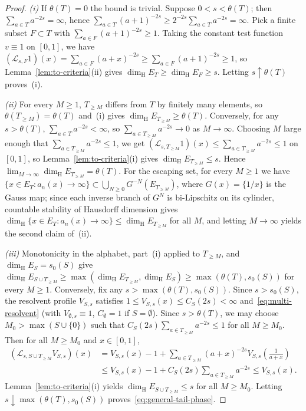 \documentclass[11pt]{article}
\theoremstyle{definition}
\theoremstyle{remark}
\newcommand{\dimH}{\dim_{\mathrm{H}}}
\begin{document}
\begin{proof}
\emph{(i)} If $\theta(T)=0$ the bound is trivial. Suppose $0<s<\theta(T)$;
then $\sum_{a\in T}a^{-2s}=\infty$, hence $\sum_{a\in T}(a+1)^{-2s}\ge
2^{-2s}\sum_{a\in T}a^{-2s}=\infty$. Pick a finite subset $F\subset T$ with
$\sum_{a\in F}(a+1)^{-2s}\ge1$. Taking the constant test function $v\equiv1$
on $[0,1]$, we have $(\mathcal L_{s,F}1)(x)=\sum_{a\in F}(a+x)^{-2s}
\ge\sum_{a\in F}(a+1)^{-2s}\ge1$, so Lemma~\ref{lem:to-criteria}(ii) gives
$\dimH E_T\ge\dimH E_F\ge s$. Letting $s\uparrow\theta(T)$ proves~(i).

\emph{(ii)} For every $M\ge1$, $T_{\ge M}$ differs from $T$ by finitely many
elements, so $\theta(T_{\ge M})=\theta(T)$ and~(i) gives
$\dimH E_{T_{\ge M}}\ge\theta(T)$. Conversely, for any $s>\theta(T)$,
$\sum_{a\in T}a^{-2s}<\infty$, so $\sum_{a\in T_{\ge M}}a^{-2s}\to0$ as
$M\to\infty$. Choosing $M$ large enough that $\sum_{a\in T_{\ge M}}a^{-2s}\le1$,
we get $(\mathcal L_{s,T_{\ge M}}1)(x)\le\sum_{a\in T_{\ge M}}a^{-2s}\le1$
on $[0,1]$, so Lemma~\ref{lem:to-criteria}(i) gives $\dimH E_{T_{\ge M}}\le s$.
Hence $\lim_{M\to\infty}\dimH E_{T_{\ge M}}=\theta(T)$. For the escaping set,
for every $M\ge1$ we have
$\{x\in E_T:a_n(x)\to\infty\}\subset\bigcup_{N\ge0}G^{-N}(E_{T_{\ge M}})$,
where $G(x)=\{1/x\}$ is the Gauss map; since each inverse branch of $G^N$ is
bi-Lipschitz on its cylinder, countable stability of Hausdorff dimension
gives $\dimH\{x\in E_T:a_n(x)\to\infty\}\le\dimH E_{T_{\ge M}}$ for all $M$,
and letting $M\to\infty$ yields the second claim of~(ii).

\emph{(iii)} Monotonicity in the alphabet, part~(i) applied to $T_{\ge M}$,
and $\dimH E_S=s_0(S)$ give
$\dimH E_{S\cup T_{\ge M}}\ge\max(\dimH E_{T_{\ge M}},\dimH E_S)\ge\max(\theta(T),s_0(S))$
for every $M\ge1$. Conversely, fix any $s>\max(\theta(T),s_0(S))$. Since
$s>s_0(S)$, the resolvent profile $V_{S,s}$ satisfies
$1\le V_{S,s}(x)\le C_S(2s)<\infty$ and~\eqref{eq:multi-resolvent} (with
$V_{\emptyset,s}\equiv1$, $C_\emptyset=1$ if $S=\emptyset$). Since
$s>\theta(T)$, we may choose $M_0>\max(S\cup\{0\})$ such that
$C_S(2s)\sum_{a\in T_{\ge M}}a^{-2s}\le1$ for all $M\ge M_0$. Then for all
$M\ge M_0$ and $x\in[0,1]$,
\begin{align*}
(\mathcal L_{s,S\cup T_{\ge M}}V_{S,s})(x)
&=V_{S,s}(x)-1+\sum_{a\in T_{\ge M}}(a+x)^{-2s}V_{S,s}\!\left(\frac{1}{a+x}\right)\\
&\le V_{S,s}(x)-1+C_S(2s)\sum_{a\in T_{\ge M}}a^{-2s}
\le V_{S,s}(x).
\end{align*}
Lemma~\ref{lem:to-criteria}(i) yields $\dimH E_{S\cup T_{\ge M}}\le s$ for
all $M\ge M_0$. Letting $s\downarrow\max(\theta(T),s_0(S))$ proves~\eqref{eq:general-tail-phase}.


\end{proof}
\end{document}
